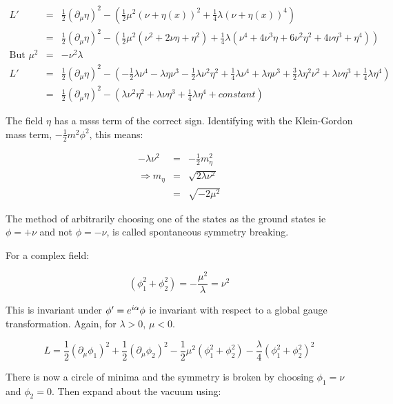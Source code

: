 \begin{eqnarray*}
  L' & = & \frac{1}{2}\left(\partial_{\mu}\eta\right)^2 - \left(\frac{1}{2}\mu^2\left(\nu + \eta(x)\right)^2 + \frac{1}{4}\lambda\left(\nu + \eta(x)\right)^4\right) \\
  & = & \frac{1}{2}\left(\partial_{\mu}\eta\right)^2 - \left(\frac{1}{2}\mu^2\left(\nu^2 + 2\nu\eta + \eta^2\right) + \frac{1}{4}\lambda\left(\nu^4 + 4\nu^3\eta + 6\nu^2\eta^2 + 4\nu\eta^3 + \eta^4\right)\right) \\
  \textrm{But } \mu^2 & = & -\nu^2\lambda \\
  L' & = & \frac{1}{2}\left(\partial_{\mu}\eta\right)^2 - \left(-\frac{1}{2}\lambda\nu^4 - \lambda\eta\nu^3 - \frac{1}{2}\lambda\nu^2\eta^2 + \frac{1}{4}\lambda\nu^4 + \lambda\eta\nu^3 + \frac{3}{2}\lambda\eta^2\nu^2 + \lambda\nu\eta^3 + \frac{1}{4}\lambda\eta^4\right) \\
  & = & \frac{1}{2}\left(\partial_{\mu}\eta\right)^2 - \left(\lambda\nu^2\eta^2 + \lambda\nu\eta^3 + \frac{1}{4}\lambda\eta^4 + constant\right)
\end{eqnarray*}

The field $\eta$ has a msss term of the correct sign.  Identifying with the Klein-Gordon mass term, $-\frac{1}{2}m^2\phi^2$, this means:

\begin{eqnarray*}
  -\lambda\nu^2 & = & -\frac{1}{2}m_{\eta}^2 \\
  \Rightarrow m_{\eta} & = & \sqrt{2\lambda\nu^2} \\
  & = & \sqrt{-2\mu^2}
\end{eqnarray*}

The method of arbitrarily choosing one of the states as the ground states ie $\phi = +\nu $ and not $\phi = -\nu$, is called spontaneous symmetry breaking.

For a complex field:

\[
  \left(\phi_1^2 + \phi_2^2\right) = -\frac{\mu^2}{\lambda} = \nu^2
\]

This is invariant under $\phi' = e^{i\alpha}\phi$ ie invariant with respect to a global gauge transformation.  Again, for $\lambda>0$, $\mu<0$.

\[
  L = \frac{1}{2}\left(\partial_{\mu}\phi_1\right)^2 + \frac{1}{2}\left(\partial_{\mu}\phi_2\right)^2 -\frac{1}{2}\mu^2\left(\phi_1^2 + \phi_2^2\right) - \frac{\lambda}{4}\left(\phi_1^2 + \phi_2^2\right)^2
\]

There is now a circle of minima and the symmetry is broken by choosing $\phi_1 = \nu$ and $\phi_2 = 0$.  Then expand about the vacuum using:

